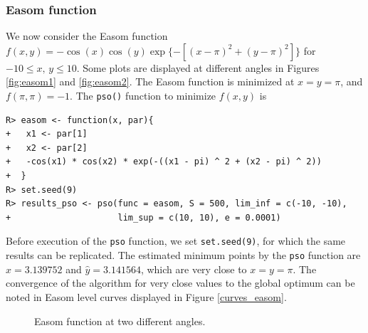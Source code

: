 \documentclass[10pt,letterpaper]{article}
\begin{document}
\subsubsection{Easom function}
We now consider the Easom function $f(x,y) = -\cos(x)\cos(y)\exp\{-[(x-\pi)^2 + (y-\pi)^2]\}$ for $-10\leq x,\,y \leq 10$.
Some plots are displayed at different angles in Figures \ref{fig:easom1} and \ref{fig:easom2}. The Easom function is
minimized at $x=y=\pi$, and $f(\pi,\pi)=-1$. The \texttt{pso()} function to minimize $f(x,y)$ is

\begin{verbatim}
R> easom <- function(x, par){
+   x1 <- par[1]
+   x2 <- par[2]
+   -cos(x1) * cos(x2) * exp(-((x1 - pi) ^ 2 + (x2 - pi) ^ 2))
+  }
R> set.seed(9)
R> results_pso <- pso(func = easom, S = 500, lim_inf = c(-10, -10), 
+                     lim_sup = c(10, 10), e = 0.0001)
\end{verbatim}

Before execution of the \texttt{pso} function, we set \texttt{set.seed(9)}, for which the same results can be replicated. The estimated minimum points by the \texttt{pso} function are $\hat{x} = 3.139752$ and $\hat{y} = 3.141564$, which are very close to $x=y=\pi$. The convergence of the algorithm for very
close values to the global optimum can be noted in Easom level curves displayed in Figure \ref{curves_easom}.
\begin{figure}[H]
\centering
{}
\caption{Easom function at two different angles.}
\label{fig:easom}
\end{figure}
\end{document}
